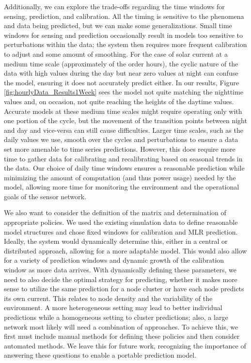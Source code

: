 \documentclass[prodmode,acmtosn]{acmsmall}
\begin{document}
Additionally, we can explore the trade-offs regarding the time windows for sensing, prediction, and calibration.
All the timing is sensitive to the phenomena and data being predicted, but we can make some generalizations.
Small time windows for sensing and prediction occasionally result in models too sensitive to perturbations within the data; the system then requires more frequent calibration to adjust and some amount of smoothing.
For the case of solar current at a medium time scale (approximately of the order hours), the cyclic nature of the data with high values during the day but near zero values at night can confuse the model, ensuring it does not accurately predict either.
In our results, Figure \ref{fig:hourlyData_Results1Week} sees the model not quite matching the nighttime values and, on occasion, not quite reaching the heights of the daytime values.
Accurate models at these medium time scales might require operating only with one portion of the cycle, but the movement of the transition points between night and day and vice-versa can still cause difficulties.
Larger time scales, such as the daily values we use, smooth over the cycles and perturbations to ensure a data set more amenable to time series predictions.
However, this does require more time to gather data for calibrating and recalibrating based on seasonal trends in the data.
Our choice of daily time windows ensures a reasonable prediction while minimizing the amount of computation (and thus power usage) needed by the model, allowing more time for monitoring the environment and the operational goals of the sensor network.

We also want to consider the definition of the matrix and determination of appropriate policies.
We used the existing simulation data to define reasonable model structures and chose fixed windows for calibration and MLR prediction.
Ideally, the system would dynamically determine this, either in a central or distributed approach, allowing for a more adaptable model.
This would also allow for a variety of prediction windows and dynamic growth of the calibration window as more data arrives.
With dynamically defining these parameters, we need to also decide the optimal strategy for predicting, whether it makes more sense to utilize the same prediction for a node cluster or have each node predicts its own current.
This relates to node density and the variability of the environment.
A more heterogeneous setting may lead to better individual predictions while a homogeneous setting to cluster predictions; also, a large network most likely will need a combination of approaches.
To achieve this, we first must include manual methods for defining these policies and then consider automated methods.
We leave this for future work, recognizing the importance of answering these questions to enable a portable prediction model.
\end{document}

